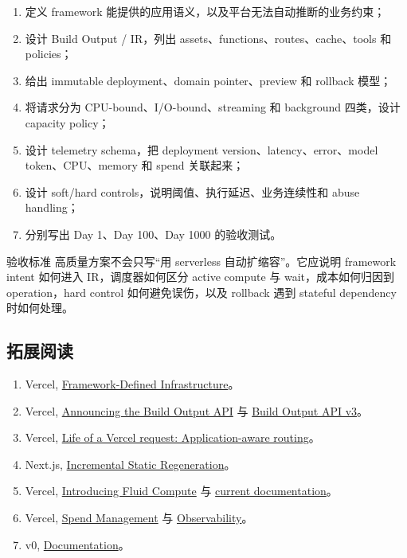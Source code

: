 \begin{enumerate}
  \item 定义 framework 能提供的应用语义，以及平台无法自动推断的业务约束；
  \item 设计 Build Output / IR，列出 assets、functions、routes、cache、tools 和 policies；
  \item 给出 immutable deployment、domain pointer、preview 和 rollback 模型；
  \item 将请求分为 CPU-bound、I/O-bound、streaming 和 background 四类，设计 capacity policy；
  \item 设计 telemetry schema，把 deployment version、latency、error、model token、CPU、memory 和 spend 关联起来；
  \item 设计 soft/hard controls，说明阈值、执行延迟、业务连续性和 abuse handling；
  \item 分别写出 Day 1、Day 100、Day 1000 的验收测试。
\end{enumerate}

\begin{knowledgebox}{验收标准}
高质量方案不会只写“用 serverless 自动扩缩容”。它应说明 framework intent 如何进入 IR，调度器如何区分 active compute 与 wait，成本如何归因到 operation，hard control 如何避免误伤，以及 rollback 遇到 stateful dependency 时如何处理。
\end{knowledgebox}

\subsection{拓展阅读}

\begin{enumerate}
  \item Vercel, \href{https://vercel.com/blog/framework-defined-infrastructure}{Framework-Defined Infrastructure}。
  \item Vercel, \href{https://vercel.com/blog/build-output-api}{Announcing the Build Output API} 与 \href{https://vercel.com/docs/build-output-api/v3}{Build Output API v3}。
  \item Vercel, \href{https://vercel.com/blog/life-of-a-request-application-aware-routing}{Life of a Vercel request: Application-aware routing}。
  \item Next.js, \href{https://nextjs.org/docs/app/guides/incremental-static-regeneration}{Incremental Static Regeneration}。
  \item Vercel, \href{https://vercel.com/blog/introducing-fluid-compute}{Introducing Fluid Compute} 与 \href{https://vercel.com/docs/fluid-compute}{current documentation}。
  \item Vercel, \href{https://vercel.com/docs/spend-management}{Spend Management} 与 \href{https://vercel.com/docs/observability}{Observability}。
  \item v0, \href{https://v0.app/docs}{Documentation}。
\end{enumerate}

